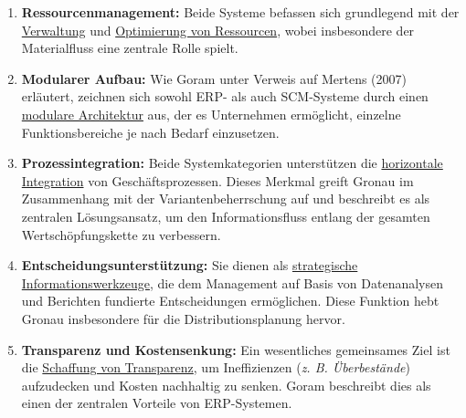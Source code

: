 \begin{enumerate}[label=\arabic*.), leftmargin=*]
    \item \textbf{Ressourcenmanagement:} Beide Systeme befassen sich grundlegend mit der \uline{Verwaltung} und \uline{Optimierung von Ressourcen}, wobei insbesondere der Materialfluss eine zentrale Rolle spielt.
    \item \textbf{Modularer Aufbau:} Wie Goram \cite[7]{11} unter Verweis auf Mertens (2007) erläutert, zeichnen sich sowohl \acs{ERP}- als auch \acs{SCM}-Systeme durch einen \uline{modulare Architektur} aus, der es Unternehmen ermöglicht, einzelne Funktionsbereiche je nach Bedarf einzusetzen.
    \item \textbf{Prozessintegration:} Beide Systemkategorien unterstützen die \uline{horizontale Integration} von Geschäftsprozessen. Dieses Merkmal greift Gronau \cite[243]{12} im Zusammenhang mit der Variantenbeherrschung auf und beschreibt es als zentralen Lösungsansatz, um den Informationsfluss entlang der gesamten Wertschöpfungskette zu verbessern.
    \item \textbf{Entscheidungsunterstützung:} Sie dienen als \uline{strategische Informationswerkzeuge}, die dem Management auf Basis von Datenanalysen und Berichten fundierte Entscheidungen ermöglichen. Diese Funktion hebt Gronau \cite[262]{13} insbesondere für die Distributionsplanung hervor.
    \item \textbf{Transparenz und Kostensenkung:} Ein wesentliches gemeinsames Ziel ist die \uline{Schaffung von Transparenz}, um Ineffizienzen (\textit{\acs{z. B.} Überbestände}) aufzudecken und Kosten nachhaltig zu senken. Goram \cite[9]{14} beschreibt dies als einen der zentralen Vorteile von \acs{ERP}-Systemen.
    \end{enumerate}

